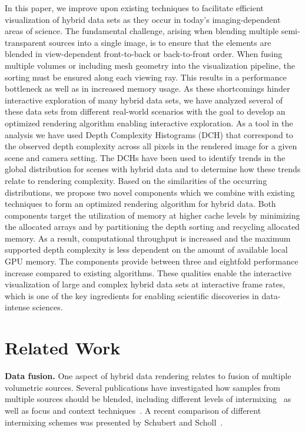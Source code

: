 \documentclass{egpubl}
\newcommand{\dch}{DCH}
\begin{document}
In this paper, we improve upon existing techniques to facilitate efficient visualization of hybrid data sets as they occur in today's imaging-dependent areas of science. 
The fundamental challenge, arising when blending multiple semi-transparent sources into a single image, is to ensure that the elements are blended in view-dependent front-to-back or back-to-front order. 
When fusing multiple volumes or including mesh geometry into the visualization pipeline, the sorting must be ensured along each viewing ray.
This results in a performance bottleneck as well as in increased memory usage. 
As these shortcomings hinder interactive exploration of many hybrid data sets, we have analyzed several of these data sets from different real-world scenarios with the goal to develop an optimized rendering algorithm enabling interactive exploration. 
As a tool in the analysis we have used {Depth Complexity Histograms} (\dch) that correspond to the observed depth complexity across all pixels in the rendered image for a given scene and camera setting. 
The \dch{}s have been used to identify trends in the global distribution for scenes with hybrid data and to determine how these trends relate to rendering complexity. 
Based on the similarities of the occurring distributions, we propose two novel components which we combine with existing techniques to form an optimized rendering algorithm for hybrid data.
Both components target the utilization of memory at higher cache levels by minimizing the allocated arrays and by partitioning the depth sorting and recycling allocated memory. 
As a result, computational throughput is increased and the maximum supported depth complexity is less dependent on the amount of available local GPU memory. 
The components provide between three and eightfold performance increase compared to existing algorithms. %
These qualities enable the interactive visualization of large and complex hybrid data sets at interactive frame rates, which is one of the key ingredients for enabling scientific discoveries in data-intense sciences.







\section{Related Work}
\label{sec:related-work}

\noindent\textbf{Data fusion.} 
%
One aspect of hybrid data rendering relates to fusion of multiple volumetric sources.
Several publications have investigated how samples from multiple sources should be blended, including different levels of intermixing~\cite{cai99intermixing} as well as focus and context techniques~\cite{viola-2007-ort}. 
A recent comparison of different intermixing schemes was presented by Schubert and Scholl~\cite{Schubert2011}. 
\end{document}
